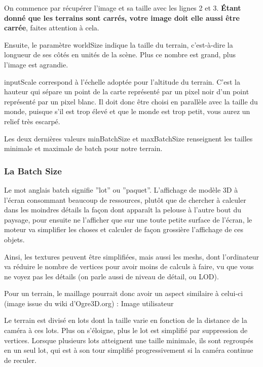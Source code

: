 On commence par r\'ecup\'erer l'image et sa taille avec les lignes 2 et 3. \textbf{\'Etant donn\'e que les terrains sont carr\'es, votre image doit elle aussi \^etre carr\'ee}, faites attention \`a cela.

Ensuite, le param\`etre worldSize indique la taille du terrain, c'est-\`a-dire la longueur de ses c\^ot\'es en unit\'es de la sc\`ene. Plus ce nombre est grand, plus l'image est agrandie.

inputScale correspond \`a l'\'echelle adopt\'ee pour l'altitude du terrain. C'est la hauteur qui s\'epare un point de la carte repr\'esent\'e par un pixel noir d'un point repr\'esent\'e par un pixel blanc. Il doit donc \^etre choisi en parall\`ele avec la taille du monde, puisque s'il est trop \'elev\'e et que le monde est trop petit, vous aurez un relief tr\`es escarp\'e.

Les deux derni\`eres valeurs minBatchSize  et maxBatchSize  renseignent les tailles minimale et maximale de batch pour notre terrain.



\subsubsection{La Batch Size}


Le mot anglais batch signifie ''lot'' ou ''paquet''. L'affichage de mod\`ele 3D \`a l'\'ecran consommant beaucoup de ressources, plut\^ot que de chercher \`a calculer dans les moindres d\'etails la fa\c{c}on dont appara\^it la pelouse \`a l'autre bout du paysage, pour ensuite ne l'afficher que sur une toute petite surface de l'\'ecran, le moteur va simplifier les choses et calculer de fa\c{c}on grossi\`ere l'affichage de ces objets.

Ainsi, les textures peuvent \^etre simplifi\'ees, mais aussi les meshs, dont l'ordinateur va r\'eduire le nombre de vertices pour avoir moins de calculs \`a faire, vu que vous ne voyez pas les d\'etails (on parle aussi de niveau de d\'etail, ou LOD).

Pour un terrain, le maillage pourrait donc avoir un aspect similaire \`a celui-ci (image issue du wiki d'Ogre3D.org) :
Image utilisateur

Le terrain est divis\'e en lots dont la taille varie en fonction de la distance de la cam\'era \`a ces lots. Plus on s'\'eloigne, plus le lot est simplifi\'e par suppression de vertices. Lorsque plusieurs lots atteignent une taille minimale, ils sont regroup\'es en un seul lot, qui est \`a son tour simplifi\'e progressivement si la cam\'era continue de reculer.

